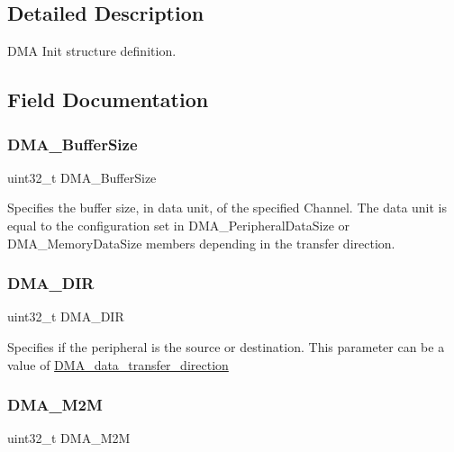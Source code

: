 \subsection{Detailed Description}
D\+MA Init structure definition. 

\subsection{Field Documentation}
\mbox{\label{struct_d_m_a___init_type_def_ad5e4b9069a7a145b3312d54d09059f78}} 
\subsubsection{\texorpdfstring{DMA\_BufferSize}{DMA\_BufferSize}}
{\footnotesize\ttfamily uint32\+\_\+t D\+M\+A\+\_\+\+Buffer\+Size}

Specifies the buffer size, in data unit, of the specified Channel. The data unit is equal to the configuration set in D\+M\+A\+\_\+\+Peripheral\+Data\+Size or D\+M\+A\+\_\+\+Memory\+Data\+Size members depending in the transfer direction. \mbox{\label{struct_d_m_a___init_type_def_a4cf4283185065f65d5a63089877cbb8d}} 
\subsubsection{\texorpdfstring{DMA\_DIR}{DMA\_DIR}}
{\footnotesize\ttfamily uint32\+\_\+t D\+M\+A\+\_\+\+D\+IR}

Specifies if the peripheral is the source or destination. This parameter can be a value of \mbox{\hyperlink{group___d_m_a__data__transfer__direction}{D\+M\+A\+\_\+data\+\_\+transfer\+\_\+direction}} \mbox{\label{struct_d_m_a___init_type_def_abe776f3b8c6a32f12bc7550097fdaede}} 
\subsubsection{\texorpdfstring{DMA\_M2M}{DMA\_M2M}}
{\footnotesize\ttfamily uint32\+\_\+t D\+M\+A\+\_\+\+M2M}

